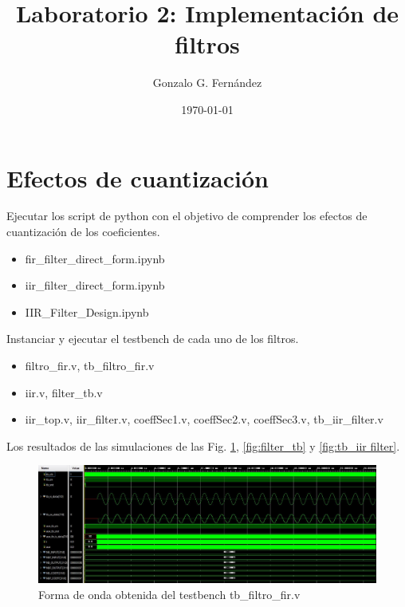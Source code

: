 \documentclass{article}
\title{\vspace{-30pt}Laboratorio 2: Implementación de filtros}
\author{Gonzalo G. Fernández}
\date{\today}
\begin{document}
\pagestyle{fancy}
\fancyhead{}

\maketitle
\thispagestyle{fancy}

\section*{Efectos de cuantización}

Ejecutar los script de python con el objetivo de comprender los efectos de cuantización de los coeficientes.

\begin{itemize}
    \item fir\_filter\_direct\_form.ipynb
    \item iir\_filter\_direct\_form.ipynb
    \item IIR\_Filter\_Design.ipynb
\end{itemize}

Instanciar y ejecutar el testbench de cada uno de los filtros.

\begin{itemize}
    \item filtro\_fir.v, tb\_filtro\_fir.v
    \item iir.v, filter\_tb.v
    \item iir\_top.v, iir\_filter.v, coeffSec1.v, coeffSec2.v, coeffSec3.v, tb\_iir\_filter.v
\end{itemize}

Los resultados de las simulaciones de las Fig. \ref{fig:tb_filtro_fir}, \ref{fig:filter_tb} y \ref{fig:tb_iir filter}.

\begin{figure}[ht]
    \centering
    \includegraphics[width=\textwidth]{sim-tb_filtro_fir.jpg}
    \caption{Forma de onda obtenida del testbench tb\_filtro\_fir.v}
    \label{fig:tb_filtro_fir}
\end{figure}
\end{document}

